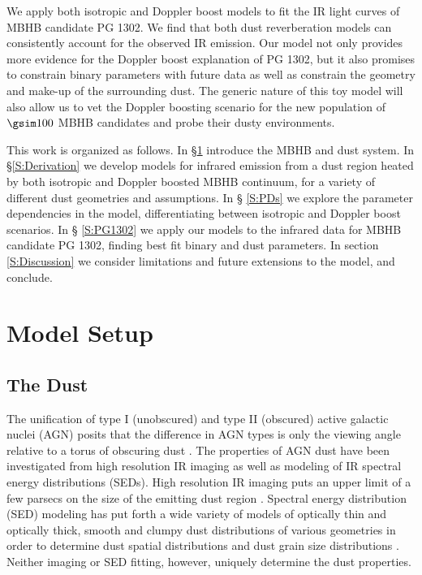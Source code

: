 We apply both isotropic and Doppler boost models to fit the IR light curves
of MBHB candidate PG 1302. We find that both dust reverberation models can
consistently account for the observed IR emission. %
Our model not only provides more evidence for the
Doppler boost explanation of PG 1302, but it also promises to constrain binary
parameters with future data as well as constrain the geometry and make-up of
the surrounding dust. The generic nature of this toy model will also allow us
to vet the Doppler boosting scenario for the new population of $\gsim100$ MBHB
candidates \citep{Graham+2015b, Charisi+2016} and probe their dusty
environments.

This work is organized as follows. In \S \ref{S:Model} introduce the MBHB and
dust system. In \S \ref{S:Derivation} we develop models for infrared emission
from a dust region heated by both isotropic and Doppler boosted MBHB
continuum, for a variety of different dust geometries and assumptions. In \S
\ref{S:PDs} we explore the parameter dependencies in the model,
differentiating between isotropic and Doppler boost scenarios. In \S
\ref{S:PG1302} we apply our models to the infrared data for MBHB candidate PG
1302, finding best fit binary and dust parameters. In section
\ref{S:Discussion} we consider limitations and future extensions to the model,
and conclude.





\section{Model Setup}
 \label{S:Model}
 \subsection{The Dust}

The unification of type I (unobscured) and type II (obscured) active galactic
nuclei (AGN) posits that the difference in AGN types is only the viewing angle
relative to a torus of obscuring dust \citep{Antonucci:1993,
KrolikBegelman:1988}. The properties of AGN dust have been investigated from
high resolution IR imaging as well as modeling of IR spectral energy
distributions (SEDs). High resolution IR imaging puts an upper limit of a few
parsecs on the size of the emitting dust region \citep[see][and references
within]{Elitzur:2006}. Spectral energy distribution (SED) modeling has put
forth a wide variety of models of optically thin and optically thick, smooth
and clumpy dust distributions of various geometries in order to determine dust
spatial distributions and dust grain size distributions  \citep[see the review by][as well as  \cite{Barvainis:1987,PierKrolikI:1992b, PierKrolikII:1993, LaorDraine:1993, GranatoDanese:1994,  Granato:1997,RowanRobinson:1995,Manske:1998,Nenkova:2002,vanBemmelDullemond:2003, Schartmann:2005, NenkovaI:2008,NenkovaII:2008, HonigII:2010, MorTrakhtenbrot:2011,MorNetzer:2012}]{Netzer:2015:rev}. Neither imaging or SED fitting, however, uniquely determine the dust properties.

